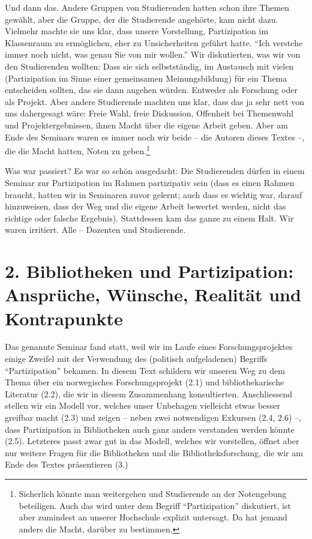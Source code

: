 \documentclass[a4paper,
fontsize=11pt,
oneside,
numbers=noperiodatend,
parskip=half-,
bibliography=totoc,
final
]{scrartcl}
\begin{document}
Und dann das. Andere Gruppen von Studierenden hatten schon ihre Themen
gewählt, aber die Gruppe, der die Studierende angehörte, kam nicht dazu.
Vielmehr machte sie uns klar, dass unsere Vorstellung, Partizipation im
Klassenraum zu ermöglichen, eher zu Unsicherheiten geführt hatte.
\enquote{Ich verstehe immer noch nicht, was genau Sie von mir wollen.}
Wir diskutierten, was wir von den Studierenden wollten: Dass sie sich
selbstständig, im Austausch mit vielen (Partizipation im Sinne einer
gemeinsamen Meinungsbildung) für ein Thema entscheiden sollten, das sie
dann angehen würden. Entweder als Forschung oder als Projekt. Aber
andere Studierende machten uns klar, dass das ja sehr nett von uns
dahergesagt wäre: Freie Wahl, freie Diskussion, Offenheit bei Themenwahl
und Projektergebnissen, ihnen Macht über die eigene Arbeit geben. Aber
am Ende des Seminars waren es immer noch wir beide -- die Autoren dieses
Textes --, die die Macht hatten, Noten zu geben.\footnote{Sicherlich
  könnte man weitergehen und Studierende an der Notengebung beteiligen.
  Auch das wird unter dem Begriff \enquote{Partizipation} diskutiert,
  ist aber zumindest an unserer Hochschule explizit untersagt. Da hat
  jemand anders die Macht, darüber zu bestimmen.}

Was war passiert? Es war so schön ausgedacht: Die Studierenden dürfen in
einem Seminar zur Partizipation im Rahmen partizipativ sein (dass es
einen Rahmen braucht, hatten wir in Seminaren zuvor gelernt; auch dass
es wichtig war, darauf hinzuweisen, dass der Weg und die eigene Arbeit
bewertet werden, nicht das richtige oder falsche Ergebnis). Stattdessen
kam das ganze zu einem Halt. Wir waren irritiert. Alle -- Dozenten und
Studierende.

\hypertarget{bibliotheken-und-partizipation-anspruxfcche-wuxfcnsche-realituxe4t-und-kontrapunkte}{%
\section{2. Bibliotheken und Partizipation: Ansprüche, Wünsche, Realität
und
Kontrapunkte}\label{bibliotheken-und-partizipation-anspruxfcche-wuxfcnsche-realituxe4t-und-kontrapunkte}}

Das genannte Seminar fand statt, weil wir im Laufe eines
Forschungsprojektes einige Zweifel mit der Verwendung des (politisch
aufgeladenen) Begriffs \enquote{Partizipation} bekamen. In diesem Text
schildern wir unseren Weg zu dem Thema über ein norwegisches
Forschungsprojekt (2.1) und bibliothekarische Literatur (2.2), die wir
in diesem Zusammenhang konsultierten. Anschliessend stellen wir ein
Modell vor, welches unser Unbehagen vielleicht etwas besser greifbar
macht (2.3) und zeigen -- neben zwei notwendigen Exkursen (2.4, 2.6) --,
dass Partizipation in Bibliotheken auch ganz anders verstanden werden
könnte (2.5). Letzteres passt zwar gut in das Modell, welches wir
vorstellen, öffnet aber nur weitere Fragen für die Bibliotheken und die
Bibliotheksforschung, die wir am Ende des Textes präsentieren (3.)
\end{document}
